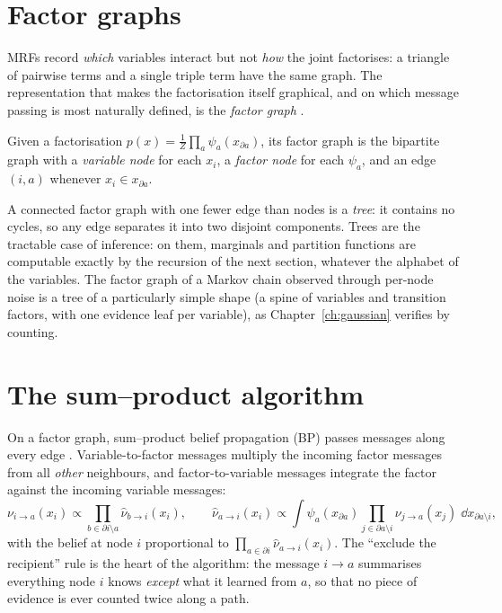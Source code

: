 \section{Factor graphs}\label{sec:factor-graphs}

MRFs record \emph{which} variables interact but not \emph{how} the joint
factorises: a triangle of pairwise terms and a single triple term have
the same graph. The representation that makes the factorisation itself
graphical, and on which message passing is most naturally defined, is
the \emph{factor graph} \citep{kschischang2001factor,
koller2009probabilistic}.

\begin{definition}
Given a factorisation
$p(x) = \frac{1}{Z}\prod_{a} \psi_a(x_{\partial a})$, its factor graph is
the bipartite graph with a \emph{variable node} for each $x_i$, a
\emph{factor node} for each $\psi_a$, and an edge $(i, a)$ whenever
$x_i \in x_{\partial a}$.
\end{definition}

A connected factor graph with one fewer edge than nodes is a
\emph{tree}: it contains no cycles, so any edge separates it into two
disjoint components. Trees are the tractable case of inference: on
them, marginals and partition functions are computable exactly by the
recursion of the next section, whatever the alphabet of the variables.
The factor graph of a Markov chain observed through per-node noise is a
tree of a particularly simple shape (a spine of variables and transition
factors, with one evidence leaf per variable), as
Chapter~\ref{ch:gaussian} verifies by counting.

\section{The sum--product algorithm}\label{sec:sum-product}

On a factor graph, sum--product belief propagation (BP) passes messages
along every edge \citep{pearl1988probabilistic, kschischang2001factor,
mezard2009information}. Variable-to-factor messages multiply the
incoming factor messages from all \emph{other} neighbours, and
factor-to-variable messages integrate the factor against the incoming
variable messages:
\begin{equation}
  \nu_{i \to a}(x_i) \propto
    \prod_{b \in \partial i \setminus a} \hat\nu_{b \to i}(x_i),
  \qquad
  \hat\nu_{a \to i}(x_i) \propto
    \int \psi_a(x_{\partial a})
    \prod_{j \in \partial a \setminus i} \nu_{j \to a}(x_j)\;
    \dd x_{\partial a \setminus i},
  \label{eq:bp-rules}
\end{equation}
with the belief at node $i$ proportional to
$\prod_{a \in \partial i} \hat\nu_{a \to i}(x_i)$. The ``exclude the
recipient'' rule is the heart of the algorithm: the message $i \to a$
summarises everything node $i$ knows \emph{except} what it learned from
$a$, so that no piece of evidence is ever counted twice along a path.

